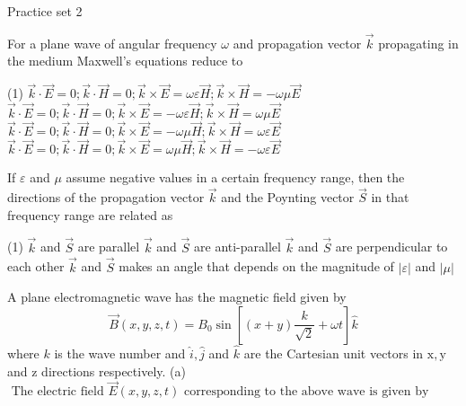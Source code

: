  
 \newpage
 \begin{abox}
 	Practice set 2 
 	\end{abox}
 \begin{enumerate}
 	\begin{minipage}{\textwidth}
 		\item For a plane wave of angular frequency $\omega$ and propagation vector $\vec{k}$ propagating in the medium Maxwell's equations reduce to
 	\end{minipage}
 	\begin{tasks}(1)
 		\task[\textbf{A.}] $\vec{k} \cdot \vec{E}=0 ; \vec{k} \cdot \vec{H}=0 ; \vec{k} \times \vec{E}=\omega \varepsilon \vec{H} ; \vec{k} \times \vec{H}=-\omega \mu \vec{E}$ 
 		\task[\textbf{B.}]$\vec{k} \cdot \vec{E}=0 ; \vec{k} \cdot \vec{H}=0 ; \vec{k} \times \vec{E}=-\omega \varepsilon \vec{H} ; \vec{k} \times \vec{H}=\omega \mu \vec{E}$
 		\task[\textbf{C.}]$\vec{k} \cdot \vec{E}=0 ; \vec{k} \cdot \vec{H}=0 ; \vec{k} \times \vec{E}=-\omega \mu \vec{H} ; \vec{k} \times \vec{H}=\omega \varepsilon \vec{E}$
 		\task[\textbf{D.}]$\vec{k} \cdot \vec{E}=0 ; \vec{k} \cdot \vec{H}=0 ; \vec{k} \times \vec{E}=\omega \mu \vec{H} ; \vec{k} \times \vec{H}=-\omega \varepsilon \vec{E}$
 	\end{tasks}
 \begin{minipage}{\textwidth}
 	\item If $\varepsilon$ and $\mu$ assume negative values in a certain frequency range, then the directions of the propagation vector $\vec{k}$ and the Poynting vector $\vec{S}$ in that frequency range are related as
 \end{minipage}
 \begin{tasks}(1)
 	\task[\textbf{A.}] $\vec{k}$ and $\vec{S}$ are parallel
 	\task[\textbf{B.}]$\vec{k}$ and $\vec{S}$ are anti-parallel
 	\task[\textbf{C.}]$\vec{k}$ and $\vec{S}$ are perpendicular to each other
 	\task[\textbf{D.}]$\vec{k}$ and $\vec{S}$ makes an angle that depends on the magnitude of $|\varepsilon|$ and $|\mu|$
 \end{tasks}
\begin{minipage}{\textwidth}
	\item A plane electromagnetic wave has the magnetic field given by
	$$
	\vec{B}(x, y, z, t)=B_{0} \sin \left[(x+y) \frac{k}{\sqrt{2}}+\omega t\right] \hat{k}
	$$
	where $k$ is the wave number and $\hat{i}, \hat{j}$ and $\hat{k}$ are the Cartesian unit vectors in $\mathrm{x}, \mathrm{y}$ and $\mathrm{z}$ directions respectively.
	(a)$\text { The electric field } \vec{E}(x, y, z, t) \text { corresponding to the above wave is given by }$\\

\end{minipage}
\end{enumerate}

